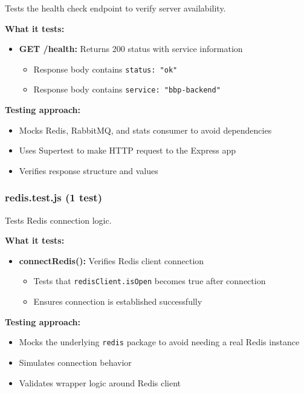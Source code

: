 Tests the health check endpoint to verify server availability.

\textbf{What it tests:}
\begin{itemize}
    \item \textbf{GET /health:} Returns 200 status with service information
    \begin{itemize}
        \item Response body contains \texttt{status: "ok"}
        \item Response body contains \texttt{service: "bbp-backend"}
    \end{itemize}
\end{itemize}

\textbf{Testing approach:}
\begin{itemize}
    \item Mocks Redis, RabbitMQ, and stats consumer to avoid dependencies
    \item Uses Supertest to make HTTP request to the Express app
    \item Verifies response structure and values
\end{itemize}

\subsubsection{redis.test.js (1 test)}
\label{subsubsec:redis_test}

Tests Redis connection logic.

\textbf{What it tests:}
\begin{itemize}
    \item \textbf{connectRedis():} Verifies Redis client connection
    \begin{itemize}
        \item Tests that \texttt{redisClient.isOpen} becomes true after connection
        \item Ensures connection is established successfully
    \end{itemize}
\end{itemize}

\textbf{Testing approach:}
\begin{itemize}
    \item Mocks the underlying \texttt{redis} package to avoid needing a real Redis instance
    \item Simulates connection behavior
    \item Validates wrapper logic around Redis client
\end{itemize}

